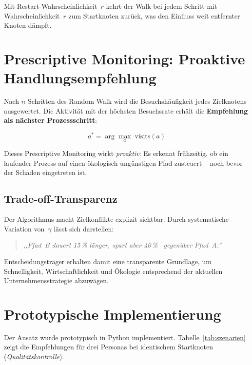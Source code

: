 \documentclass[12pt, a4paper]{article}
\begin{document}
Mit Restart-Wahrscheinlichkeit~$r$ kehrt der Walk
bei jedem Schritt mit Wahrscheinlichkeit~$r$ zum Startknoten zurück,
was den Einfluss weit entfernter Knoten dämpft.

\section{Prescriptive Monitoring: Proaktive Handlungsempfehlung}
\label{sec:prescriptive}

Nach $n$ Schritten des Random Walk wird die Besuchshäufigkeit
jedes Zielknotens ausgewertet.
Die Aktivität mit der höchsten Besuchsrate erhält die
\textbf{Empfehlung als nächster Prozessschritt}:

\begin{equation}
  a^* = \arg\max_{a} \;\text{visits}(a)
\end{equation}

Dieses Prescriptive Monitoring wirkt \emph{proaktiv}:
Es erkennt frühzeitig, ob ein laufender Prozess
auf einen ökologisch ungünstigen Pfad zusteuert --
noch bevor der Schaden eingetreten ist.

\subsection{Trade-off-Transparenz}

Der Algorithmus macht Zielkonflikte explizit sichtbar.
Durch systematische Variation von~$\gamma$ lässt sich darstellen:

\begin{quote}
  \emph{,,Pfad~B dauert 15\,\% länger, spart aber 40\,\% \COO~gegenüber Pfad~A.''}
\end{quote}

Entscheidungsträger erhalten damit eine transparente Grundlage,
um Schnelligkeit, Wirtschaftlichkeit und Ökologie
entsprechend der aktuellen Unternehmensstrategie abzuwägen.

\section{Prototypische Implementierung}
\label{sec:implementierung}

Der Ansatz wurde prototypisch in Python implementiert.
Tabelle~\ref{tab:szenarien} zeigt die Empfehlungen
für drei Personas bei identischem Startknoten (\emph{Qualitätskontrolle}).
\end{document}
